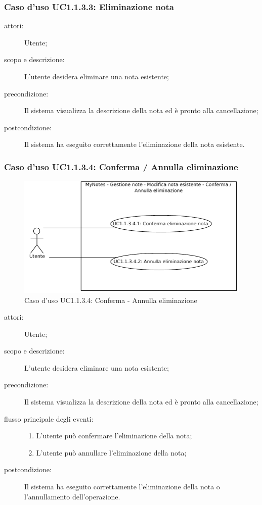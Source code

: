 \subsubsection{Caso d'uso UC1.1.3.3: Eliminazione nota}
\begin{description}
\item[attori:] Utente;
\item[scopo e descrizione:] L'utente desidera eliminare una nota esistente;
\item[precondizione:] Il sistema visualizza la descrizione della nota ed è pronto alla cancellazione;
\item[postcondizione:] Il sistema ha eseguito correttamente l'eliminazione della nota esistente.
\end{description}

\subsubsection{Caso d'uso UC1.1.3.4: Conferma / Annulla eliminazione}
\begin{figure}[htb]
\centering
\includegraphics[scale=0.6]{gfx/useCase/MN_UC1-1-3-4_Conferma-Annulla_eliminazione.pdf}
\caption{Caso d'uso UC1.1.3.4: Conferma - Annulla eliminazione}
\label{fig:My notes UC1.1.3.4}
\end{figure}

\begin{description}
\item[attori:] Utente;
\item[scopo e descrizione:] L'utente desidera eliminare una nota esistente;
\item[precondizione:] Il sistema visualizza la descrizione della nota ed è pronto alla cancellazione;
\item[flusso principale degli eventi:] \hfill
	\begin{enumerate}
	\item L'utente può confermare l'eliminazione della nota;
	\item L'utente può annullare l'eliminazione della nota;
	\end{enumerate}
\item[postcondizione:] Il sistema ha eseguito correttamente l'eliminazione della nota o l'annullamento dell'operazione.
\end{description}

